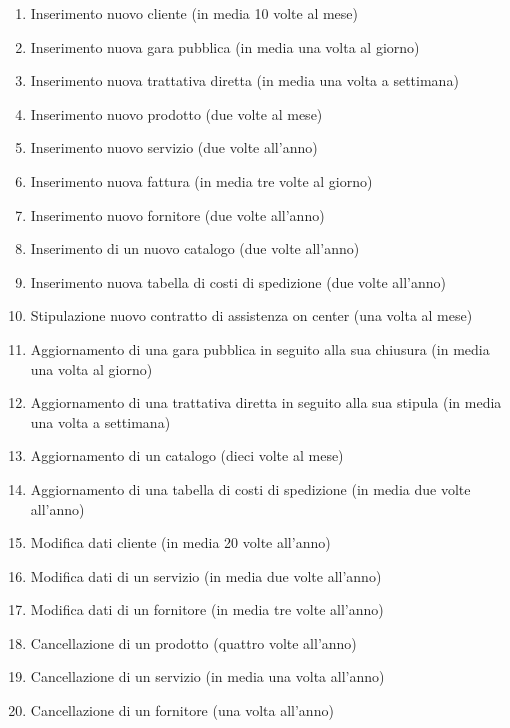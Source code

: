 

\begin{enumerate}

  \item Inserimento nuovo cliente (in media 10 volte al mese)
  \item Inserimento nuova gara pubblica (in media una volta al giorno)
  \item Inserimento nuova trattativa diretta (in media una volta a settimana)
  \item Inserimento nuovo prodotto (due volte al mese)
  \item Inserimento nuovo servizio (due volte all'anno)
  \item Inserimento nuova fattura (in media tre volte al giorno)
  \item Inserimento nuovo fornitore (due volte all'anno)
  \item Inserimento di un nuovo catalogo (due volte all'anno)
  \item Inserimento nuova tabella di costi di spedizione (due volte all'anno)
  \item Stipulazione nuovo contratto di assistenza on center (una volta al mese)
  \item Aggiornamento di una gara pubblica in seguito alla sua chiusura (in media una volta al giorno)
  \item Aggiornamento di una trattativa diretta in seguito alla sua stipula (in media una volta a settimana)
  \item Aggiornamento di un catalogo (dieci volte al mese)
  \item Aggiornamento di una tabella di costi di spedizione (in media due volte all'anno)
  \item Modifica dati cliente (in media 20 volte all'anno)
  \item Modifica dati di un servizio (in media due volte all'anno)
  \item Modifica dati di un fornitore (in media tre volte all'anno)
  \item Cancellazione di un prodotto (quattro volte all'anno)
  \item Cancellazione di un servizio (in media una volta all'anno)
  \item Cancellazione di un fornitore (una volta all'anno)

\end{enumerate}
